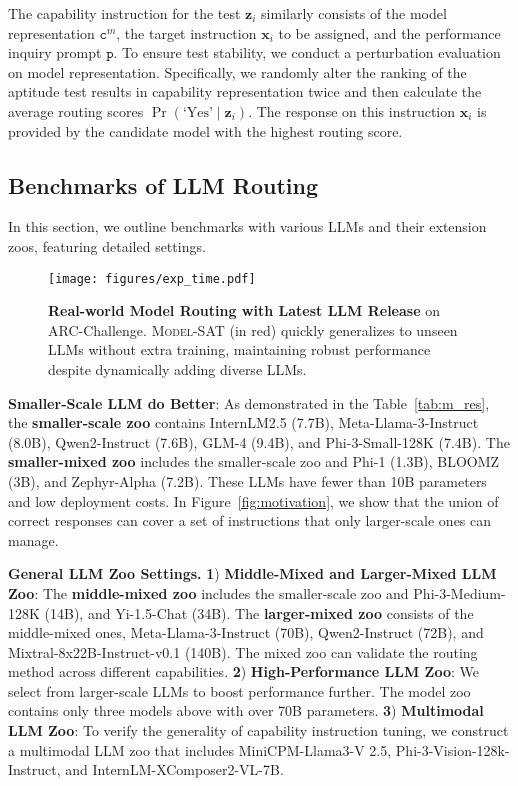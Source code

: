 The capability instruction for the test $\mathbf{z}_i$ similarly consists of the model representation $\texttt{c}^m$, the target instruction $\mathbf{x}_i$ to be assigned, and the performance inquiry prompt $\texttt{p}$. To ensure test stability, we conduct a perturbation evaluation on model representation. Specifically, we randomly alter the ranking of the aptitude test results in capability representation twice and then calculate the average routing scores $\operatorname{Pr}\left( \text{`Yes'} \mid \mathbf{z}_i \right)$. The response on this instruction $\mathbf{x}_i$ is provided by the candidate model with the highest routing score.





\subsection{Benchmarks of LLM Routing}

\label{sec:benchmarks}
In this section, we outline benchmarks with various LLMs and their extension zoos, featuring detailed settings.

\begin{figure*}[t]
    \centering
    \vspace{-10pt}
    \texttt{[image: figures/exp\_time.pdf]}
    \caption{\textbf{Real-world Model Routing with Latest LLM Release} on ARC-Challenge. \textsc{Model-SAT} (in red) quickly generalizes to unseen LLMs without extra training, maintaining robust performance despite dynamically adding diverse LLMs.}
    \label{fig:exp_time}
    \vspace{-12pt}
\end{figure*}
\textbf{Smaller-Scale LLM do Better}: As demonstrated in the Table~\ref{tab:m_res}, the \textbf{smaller-scale zoo} contains InternLM2.5 (7.7B), Meta-Llama-3-Instruct (8.0B), Qwen2-Instruct (7.6B), GLM-4 (9.4B), and Phi-3-Small-128K (7.4B).
The \textbf{smaller-mixed zoo} includes the smaller-scale zoo and Phi-1 (1.3B), BLOOMZ (3B), and Zephyr-Alpha (7.2B).
These LLMs have fewer than 10B parameters and low deployment costs.
In Figure~\ref{fig:motivation}, we show that the union of correct responses can cover a set of instructions that only larger-scale ones can manage.

\textbf{General LLM Zoo Settings.} \textbf{1}) \textbf{Middle-Mixed and Larger-Mixed LLM Zoo}: The \textbf{middle-mixed zoo} includes the smaller-scale zoo and Phi-3-Medium-128K (14B), and Yi-1.5-Chat (34B). The \textbf{larger-mixed zoo} consists of the middle-mixed ones, Meta-Llama-3-Instruct (70B), Qwen2-Instruct (72B), and Mixtral-8x22B-Instruct-v0.1 (140B). The mixed zoo can validate the routing method across different capabilities.
\textbf{2}) \textbf{High-Performance LLM Zoo}: We select from larger-scale LLMs to boost performance further.
The model zoo contains only three models above with over 70B parameters.
\textbf{3}) \textbf{Multimodal LLM Zoo}: To verify the generality of capability instruction tuning, we construct a multimodal LLM zoo that includes MiniCPM-Llama3-V 2.5, Phi-3-Vision-128k-Instruct, and InternLM-XComposer2-VL-7B.

